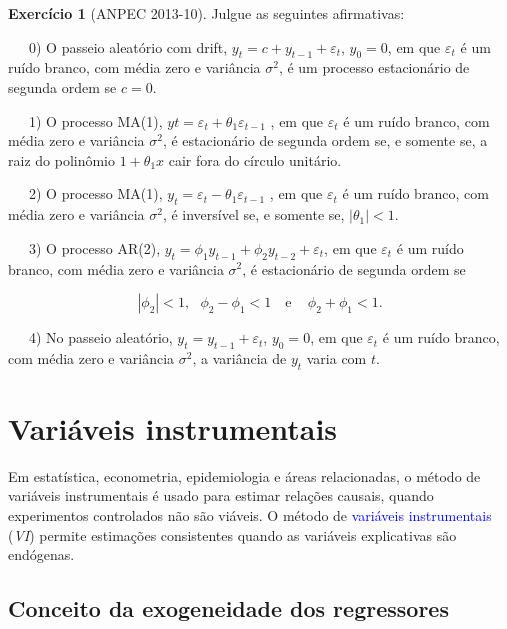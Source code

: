 \documentclass[
]{book}
\theoremstyle{definition}
\theoremstyle{definition}
\theoremstyle{definition}
\newtheorem{exercise}{Exercício}[chapter]
\theoremstyle{remark}
\begin{document}
\begin{exercise}[ANPEC 2013-10]
\protect\hypertarget{exr:exervf7}{}{\label{exr:exervf7} {} }Julgue as seguintes afirmativas:

~~~0) O passeio aleatório com drift, \(y_t = c + y_{t-1} + \varepsilon_t\), \(y_0 = 0\), em que \(\varepsilon_t\) é um ruído branco, com média zero e variância \(\sigma^2\), é um processo estacionário de segunda ordem se \(c = 0\).

~~~1) O processo MA(1), \(yt = \varepsilon_t + \theta_1 \varepsilon_{t-1}\) , em que \(\varepsilon_t\) é um ruído branco, com média zero e variância \(\sigma^2\), é estacionário de segunda ordem se, e somente se, a raiz do polinômio \(1 + \theta_1x\) cair fora do círculo unitário.

~~~2) O processo MA(1), \(y_t = \varepsilon_t -\theta_1 \varepsilon_{t-1}\) , em que \(\varepsilon_t\) é um ruído branco, com média zero e variância \(\sigma^2\), é inversível se, e somente se, \(|\theta_1| < 1\).

~~~3) O processo AR(2), \(y_t = \phi_1y_{t-1} + \phi_2y_{t-2} + \varepsilon_t\), em que \(\varepsilon_t\) é um ruído branco, com média zero e variância \(\sigma^2\), é estacionário de segunda ordem se

\[|\phi_2| < 1,\,\,\,\, \phi_2 - \phi_1 < 1\,\,\,\,\mbox{ e }\,\,\,\,\, \phi_2 + \phi_1 < 1.\]

~~~4) No passeio aleatório, \(y_t = y_{t-1} + \varepsilon_t\), \(y_0 = 0\), em que \(\varepsilon_t\) é um ruído branco, com média zero e variância \(\sigma^2\), a variância de \(y_t\) varia com \(t\).
\end{exercise}

\hypertarget{vi}{%
\chapter{Variáveis instrumentais}\label{vi}}

Em estatística, econometria, epidemiologia e áreas relacionadas, o método de variáveis instrumentais é usado para estimar relações causais, quando experimentos controlados não são viáveis. O método de \textcolor{blue}{ variáveis instrumentais } (\emph{VI}) permite estimações consistentes quando as variáveis explicativas são endógenas.

\hypertarget{conceito-da-exogeneidade-dos-regressores}{%
\section{Conceito da exogeneidade dos regressores}\label{conceito-da-exogeneidade-dos-regressores}}
\end{document}
